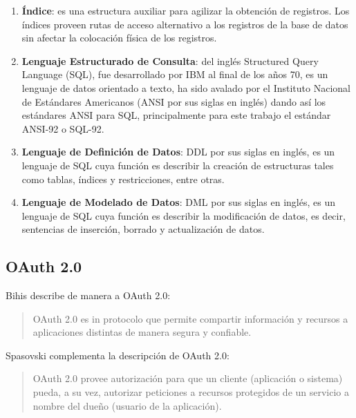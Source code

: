 \begin{enumerate}
\begin{enumerate}
	\end{enumerate}
	\item \textbf{Índice}: es una estructura auxiliar para agilizar la obtención de registros. Los índices proveen rutas de acceso alternativo a los registros de la base de datos sin afectar la colocación física de los registros\cite{FundamentalsOfDBSystems}.
	\item \textbf{Lenguaje Estructurado de Consulta}\label{sec:sql}: del inglés Structured Query Language (SQL), fue desarrollado por IBM\textsuperscript{\textcopyright} al final de los años 70, es un lenguaje de datos orientado a texto, ha sido avalado por el Instituto Nacional de Estándares Americanos (ANSI por sus siglas en inglés) dando así los estándares ANSI para SQL, principalmente para este trabajo el estándar ANSI-92 o SQL-92.
	\item \textbf{Lenguaje de Definición de Datos}: DDL por sus siglas en inglés, es un lenguaje de SQL cuya función es describir la creación de estructuras tales como tablas, índices y restricciones, entre otras\cite{DataBaseConcepts}.
	\item \textbf{Lenguaje de Modelado de Datos}: DML por sus siglas en inglés, es un lenguaje de SQL cuya función es describir la modificación de datos, es decir, sentencias de inserción, borrado y actualización de datos\cite{DataBaseConcepts}.  
\end{enumerate}

\subsection{OAuth 2.0}\label{sec:oauth}
Bihis\cite{MasteringOAuth2} describe de manera a OAuth 2.0:
\begin{quote}
	OAuth 2.0 es in protocolo que permite compartir información y recursos a aplicaciones distintas de manera segura y confiable.
\end{quote}

Spasovski\cite{OAuth2Identity} complementa la descripción de OAuth 2.0:
\begin{quote}
	OAuth 2.0 provee autorización para que un cliente (aplicación o sistema) pueda, a su vez, autorizar peticiones a recursos protegidos de un servicio a nombre del dueño (usuario de la aplicación).
\end{quote}

